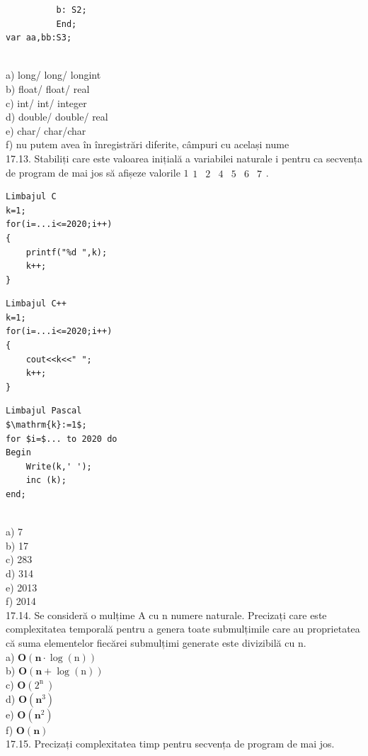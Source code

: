 {{\begin{verbatim}
          b: S2; 
          End; 
var aa,bb:S3;
\end{verbatim}
\\
a) long/ long/ longint
\\
b) float/ float/ real
\\
c) int/ int/ integer
\\
d) double/ double/ real
\\
e) char/ char/char
\\
f) nu putem avea în înregistrări diferite, câmpuri cu același nume
\\
17.13. Stabiliți care este valoarea inițială a variabilei naturale i pentru ca secvența de program de mai jos să afișeze valorile $1 \begin{array}{llllll}1 & 2 & 4 & 5 & 6 & 7\end{array}$.
\begin{verbatim}
Limbajul C
k=1;
for(i=...i<=2020;i++)
{
    printf("%d ",k);
    k++;
}
\end{verbatim}
\begin{verbatim}
Limbajul C++
k=1;
for(i=...i<=2020;i++)
{
    cout<<k<<" ";
    k++;
}
\end{verbatim}
\begin{verbatim}
Limbajul Pascal
$\mathrm{k}:=1$;
for $i=$... to 2020 do
Begin
    Write(k,' ');
    inc (k);
end;
\end{verbatim}
\\
a) 7
\\
b) 17
\\
c) 283
\\
d) 314
\\
e) 2013
\\
f) 2014
\\
17.14. Se consideră o mulțime A cu n numere naturale. Precizați care este complexitatea temporală pentru a genera toate submulțimile care au proprietatea că suma elementelor fiecărei submulțimi generate este divizibilă cu n.
\\
a) $\mathbf{O}(\mathbf{n} \cdot \log (\mathrm{n}))$
\\
b) $\mathbf{O}(\mathbf{n}+\log (\mathrm{n}))$
\\
c) $\mathbf{O}\left(2^{\text {n }}\right)$
\\
d) $\mathbf{O}\left(\mathbf{n}^{3}\right)$
\\
e) $\mathbf{O}\left(\mathbf{n}^{2}\right)$
\\
f) $\mathbf{O}(\mathbf{n})$
\\
17.15. Precizați complexitatea timp pentru secvența de program de mai jos.
}}
